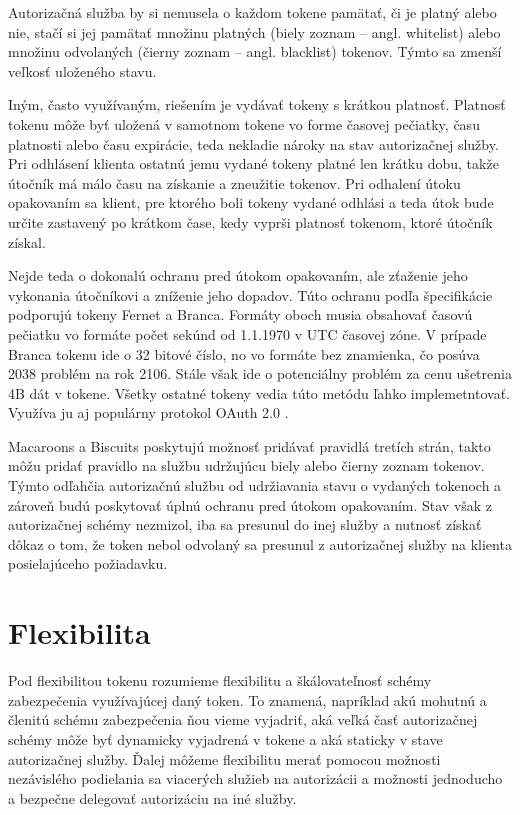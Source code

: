 Autorizačná služba by si nemusela o každom tokene pamätať, či je platný alebo nie, stačí si jej pamätať množinu platných (biely zoznam -- angl. whitelist) alebo množinu odvolaných (čierny zoznam -- angl. blacklist) tokenov. Týmto sa zmenší veľkosť uloženého stavu.

Iným, často využívaným, riešením je vydávať tokeny s krátkou platnosť. Platnosť tokenu môže byť uložená v samotnom tokene vo forme časovej pečiatky, času platnosti alebo času expirácie, teda nekladie nároky na stav autorizačnej služby. Pri odhlásení klienta ostatnú jemu vydané tokeny platné len krátku dobu, takže útočník má málo času na získanie a zneužitie tokenov. Pri odhalení útoku opakovaním sa klient, pre ktorého boli tokeny vydané odhlási a teda útok bude určite zastavený po krátkom čase, kedy vyprši platnosť tokenom, ktoré útočník získal.

Nejde teda o dokonalú ochranu pred útokom opakovaním, ale zťaženie jeho vykonania útočníkovi a zníženie jeho dopadov. Túto ochranu podľa špecifikácie podporujú tokeny Fernet a Branca. Formáty oboch musia obsahovať časovú pečiatku vo formáte počet sekúnd od 1.1.1970 v UTC časovej zóne. V prípade Branca tokenu ide o 32 bitové číslo, no vo formáte bez znamienka, čo posúva 2038 problém \cite{epoch_end} na rok 2106. Stále však ide o potenciálny problém za cenu ušetrenia 4B dát v tokene. Všetky ostatné tokeny vedia túto metódu ľahko implemetntovať. Využíva ju aj populárny protokol OAuth 2.0 \cite{oauth2}.

Macaroons a Biscuits poskytujú možnosť pridávať pravidlá tretích strán, takto môžu pridať pravidlo na službu udržujúcu biely alebo čierny zoznam tokenov. Týmto odľahčia autorizačnú službu od udržiavania stavu o vydaných tokenoch a zároveň budú poskytovať úplnú ochranu pred útokom opakovaním. Stav však z autorizačnej schémy nezmizol, iba sa presunul do inej služby a nutnosť získať dôkaz o tom, že token nebol odvolaný sa presunul z autorizačnej služby na klienta posielajúceho požiadavku.

\section{Flexibilita}

Pod flexibilitou tokenu rozumieme flexibilitu a škálovateľnosť schémy zabezpečenia využívajúcej daný token. To znamená, napríklad akú mohutnú a členitú schému zabezpečenia ňou vieme vyjadriť, aká veľká časť autorizačnej schémy môže byť dynamicky vyjadrená v tokene a aká staticky v stave autorizačnej služby. Ďalej môžeme flexibilitu merať pomocou možnosti nezávislého podielania sa viacerých služieb na autorizácii a možnosti jednoducho a bezpečne delegovať autorizáciu na iné služby.

